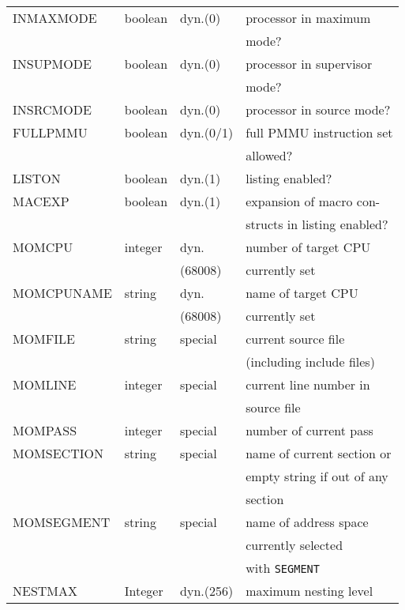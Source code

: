 \documentclass[12pt,twoside]{report}
\newcommand{\tty}[1]{{\tt #1}}
\begin{document}
\begin{center}
\begin{longtable}{|l|l|l|l|}
INMAXMODE     & boolean   & dyn.(0)    & processor in maximum \\
              &           &            & mode? \\
INSUPMODE     & boolean   & dyn.(0)    & processor in supervisor \\
              &           &            & mode? \\
INSRCMODE     & boolean   & dyn.(0)    & processor in source mode? \\
FULLPMMU      & boolean   & dyn.(0/1)  & full PMMU instruction set \\
              &           &            & allowed? \\
LISTON        & boolean   & dyn.(1)    & listing enabled? \\
MACEXP        & boolean   & dyn.(1)    & expansion of macro con- \\
              &           &            & structs in listing enabled? \\
MOMCPU        & integer   & dyn.       & number of target CPU \\
	      & 	  & (68008)    & currently set \\
MOMCPUNAME    & string    & dyn.       & name of target CPU \\
              &           & (68008)    & currently set \\
MOMFILE       & string    & special    & current source file \\
              &           &            & (including include files) \\
MOMLINE       & integer   & special    & current line number in  \\
              &           &            & source file \\
MOMPASS       & integer   & special    & number of current pass \\
MOMSECTION    & string    & special    & name of current section or \\
	      & 	  &	       & empty string if out of any \\
              &           &            & section \\
MOMSEGMENT    & string    & special    & name of address space \\
              &           &            & currently selected \\
              &           &            & with \tty{SEGMENT} \\
NESTMAX       &  Integer  & dyn.(256)  & maximum nesting level \\

\end{longtable}
\end{center}
\end{document}
